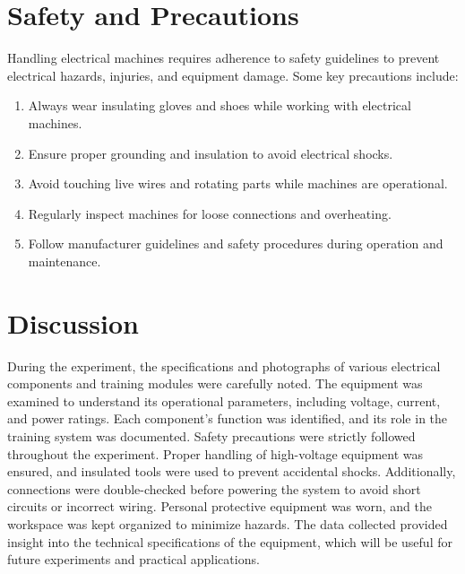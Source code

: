 \documentclass[a4paper,12pt]{article}
\begin{document}
	\section{Safety and Precautions}
	Handling electrical machines requires adherence to safety guidelines to prevent electrical hazards, injuries, and equipment damage. Some key precautions include:
	\begin{enumerate}
		\item Always wear insulating gloves and shoes while working with electrical machines.
		\item Ensure proper grounding and insulation to avoid electrical shocks.
		\item Avoid touching live wires and rotating parts while machines are operational.
		\item Regularly inspect machines for loose connections and overheating.
		\item Follow manufacturer guidelines and safety procedures during operation and maintenance.
	\end{enumerate}
	

	


	
	
	
	
	
	
	
	
	\section{Discussion}
	
During the experiment, the specifications and photographs of various electrical components and training modules were carefully noted. The equipment was examined to understand its operational parameters, including voltage, current, and power ratings. Each component’s function was identified, and its role in the training system was documented.
Safety precautions were strictly followed throughout the experiment. Proper handling of high-voltage equipment was ensured, and insulated tools were used to prevent accidental shocks. Additionally, connections were double-checked before powering the system to avoid short circuits or incorrect wiring. Personal protective equipment was worn, and the workspace was kept organized to minimize hazards.
The data collected provided insight into the technical specifications of the equipment, which will be useful for future experiments and practical applications.
	
	
	
\end{document}
